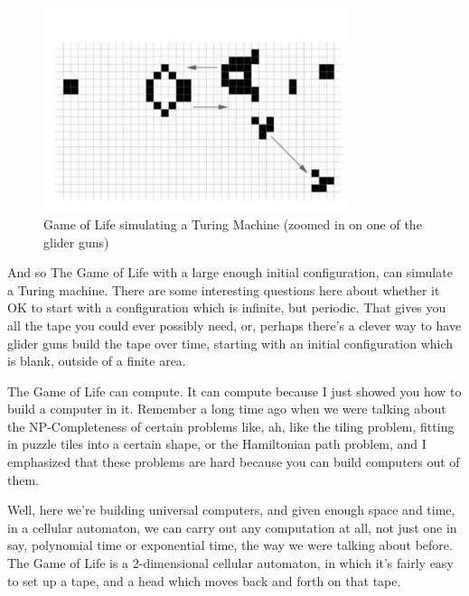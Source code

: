 \documentclass[]{article}
\begin{document}
\begin{figure}[H]
	\begin{center}
		\caption[Game of Life simulating a Turing Machine (detail)]{Game of Life simulating a Turing Machine (zoomed in on one of the glider guns)}\label{fig:complicated-configuration}
		\includegraphics[width=0.8\textwidth]{complicated-configuration}
	\end{center}
\end{figure}
And so The Game of Life with a large enough initial configuration, can simulate a Turing machine. There are some interesting questions here about whether it OK to start with a configuration which is infinite, but periodic. That gives you all the tape
you could ever possibly need, or, perhaps there's a clever way to have glider guns build the tape over time, starting with an initial configuration which is blank, outside of a finite area.

The Game of Life can compute. It can compute because I just showed you how to build a computer in it. Remember a long time ago when we were talking about the NP-Completeness of certain problems like, ah, like the tiling problem, fitting in puzzle tiles into a certain shape, or the Hamiltonian path problem, and I emphasized that these problems are hard because you can build computers out of them.

Well, here we're building universal computers, and given enough space and time, in a cellular automaton, we can carry out any computation at all, not just one in say,
polynomial time or exponential time, the way we were talking about before. The Game of Life is a 2-dimensional cellular automaton, in which it's fairly easy to set up a tape,
and a head which moves back and forth on that tape.
\end{document}

